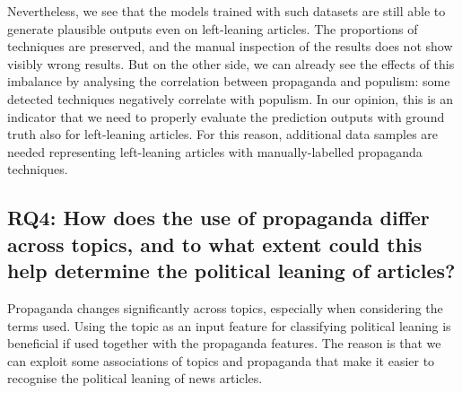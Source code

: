 \begin{enumerate}[label={\textbf{RQ3.\arabic*:}},leftmargin=2cm]
          Nevertheless, we see that the models trained with such datasets are still able to generate plausible outputs even on left-leaning articles. The proportions of techniques are preserved, and the manual inspection of the results does not show visibly wrong results.
          But on the other side, we can already see the effects of this imbalance by analysing the correlation between propaganda and populism: some detected techniques negatively correlate with populism.
          In our opinion, this is an indicator that we need to properly evaluate the prediction outputs with ground truth also for left-leaning articles. For this reason, additional data samples are needed representing left-leaning articles with manually-labelled propaganda techniques.
\end{enumerate}


\subsection*{RQ4: How does the use of propaganda differ across topics, and to what extent could this help determine the political leaning of articles?}


Propaganda changes significantly across topics, especially when considering the terms used. Using the topic as an input feature for classifying political leaning is beneficial if used together with the propaganda features. The reason is that we can exploit some associations of topics and propaganda that make it easier to recognise the political leaning of news articles.

